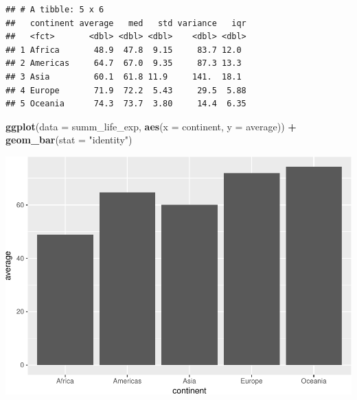 \documentclass[11pt,]{article}
\newenvironment{Shaded}{\begin{snugshade}}{\end{snugshade}}
\newcommand{\KeywordTok}[1]{\textcolor[rgb]{0.13,0.29,0.53}{\textbf{#1}}}
\newcommand{\DataTypeTok}[1]{\textcolor[rgb]{0.13,0.29,0.53}{#1}}
\newcommand{\StringTok}[1]{\textcolor[rgb]{0.31,0.60,0.02}{#1}}
\newcommand{\OperatorTok}[1]{\textcolor[rgb]{0.81,0.36,0.00}{\textbf{#1}}}
\newcommand{\NormalTok}[1]{#1}
\begin{document}
\begin{verbatim}
## # A tibble: 5 x 6
##   continent average   med   std variance   iqr
##   <fct>       <dbl> <dbl> <dbl>    <dbl> <dbl>
## 1 Africa       48.9  47.8  9.15     83.7 12.0 
## 2 Americas     64.7  67.0  9.35     87.3 13.3 
## 3 Asia         60.1  61.8 11.9     141.  18.1 
## 4 Europe       71.9  72.2  5.43     29.5  5.88
## 5 Oceania      74.3  73.7  3.80     14.4  6.35
\end{verbatim}

\begin{Shaded}
\begin{Highlighting}[]
\KeywordTok{ggplot}\NormalTok{(}\DataTypeTok{data =}\NormalTok{ summ_life_exp, }
       \KeywordTok{aes}\NormalTok{(}\DataTypeTok{x =}\NormalTok{ continent, }\DataTypeTok{y =}\NormalTok{ average)) }\OperatorTok{+}
\StringTok{  }\KeywordTok{geom_bar}\NormalTok{(}\DataTypeTok{stat =} \StringTok{"identity"}\NormalTok{)}
\end{Highlighting}
\end{Shaded}

\includegraphics{Intro_data_wrangling_files/figure-latex/summ_cont-1.pdf}

\begin{Shaded}
\end{Shaded}
\end{document}
